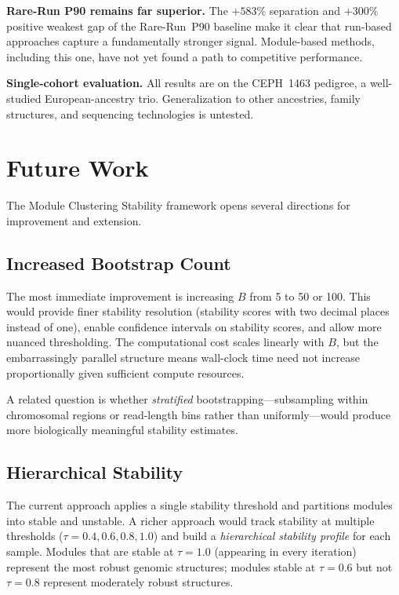 \documentclass{../yalumba}
\begin{document}
\begin{limitation}
\textbf{Rare-Run P90 remains far superior.}  The $+583\%$ separation and
$+300\%$ positive weakest gap of the Rare-Run~P90 baseline make it clear that
run-based approaches capture a fundamentally stronger signal.  Module-based
methods, including this one, have not yet found a path to competitive
performance.
\end{limitation}

\begin{limitation}
\textbf{Single-cohort evaluation.}  All results are on the CEPH~1463 pedigree,
a well-studied European-ancestry trio.  Generalization to other ancestries,
family structures, and sequencing technologies is untested.
\end{limitation}


\section{Future Work}
\label{sec:future}

The Module Clustering Stability framework opens several directions for
improvement and extension.

\subsection{Increased Bootstrap Count}

The most immediate improvement is increasing $B$ from 5 to 50 or 100.  This
would provide finer stability resolution (stability scores with two decimal
places instead of one), enable confidence intervals on stability scores, and
allow more nuanced thresholding.  The computational cost scales linearly with
$B$, but the embarrassingly parallel structure means wall-clock time need not
increase proportionally given sufficient compute resources.

A related question is whether \emph{stratified} bootstrapping---subsampling
within chromosomal regions or read-length bins rather than uniformly---would
produce more biologically meaningful stability estimates.

\subsection{Hierarchical Stability}

The current approach applies a single stability threshold and partitions modules
into stable and unstable.  A richer approach would track stability at multiple
thresholds ($\tau = 0.4, 0.6, 0.8, 1.0$) and build a \emph{hierarchical
stability profile} for each sample.  Modules that are stable at $\tau = 1.0$
(appearing in every iteration) represent the most robust genomic structures;
modules stable at $\tau = 0.6$ but not $\tau = 0.8$ represent moderately
robust structures.
\end{document}
